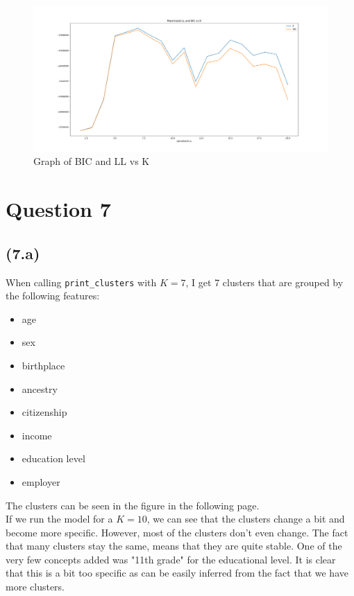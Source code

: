 \documentclass[letterpaper, 12pt]{article}
\begin{document}
\begin{figure}[!h]
    \centering
    \includegraphics[scale=0.3]{BICvK}
    \caption{Graph of BIC and LL vs K}
\end{figure}
\pagebreak

\section*{Question 7}

\subsection*{(7.a)}
When calling \texttt{print\_clusters} with $K=7$, I get 7 clusters that are grouped by the following features:
\begin{itemize}
  \item age
  \item sex
  \item birthplace
  \item ancestry
  \item citizenship
  \item income
  \item education level
  \item employer
\end{itemize}

The clusters can be seen in the figure in the following page.
\\
If we run the model for a $K=10$, we can see that the clusters change a bit and become more specific. However, most of the clusters don't even change. The fact that many clusters stay the same, means that they are quite stable. One of the very few concepts added was "11th grade" for the educational level. It is clear that this is a bit too specific as can be easily inferred from the fact that we have more clusters. 
\end{document}
